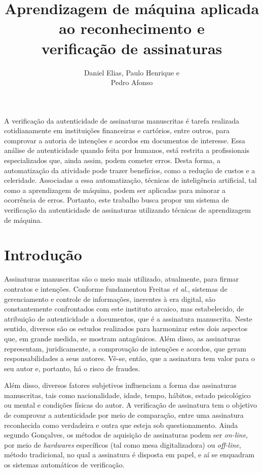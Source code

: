 \documentclass[12pt]{article}
\title{Aprendizagem de máquina aplicada ao reconhecimento e \\verificação de assinaturas}
\author{Daniel Elias\inst{1}, Paulo Henrique\inst{1} e \\Pedro Afonso\inst{1}}
\begin{document}
 
	
	\maketitle
	
	\begin{resumo} 
		A verificação da autenticidade de assinaturas manuscritas é tarefa realizada cotidianamente em instituições financeiras e cartórios, entre outros, para comprovar a autoria de intenções e acordos em documentos de interesse. Essa análise de autenticidade quando feita por humanos, está restrita a profissionais especializados que, ainda assim, podem cometer erros. Desta forma, a automatização da atividade pode trazer benefícios, como a redução de custos e a celeridade. Associadas a essa automatização, técnicas de inteligência artificial, tal como a aprendizagem de máquina, podem ser aplicadas para minorar a ocorrência de erros. Portanto, este trabalho busca propor um sistema de verificação da autenticidade de assinaturas utilizando técnicas de aprendizagem de máquina.
	\end{resumo}
	
	\section{Introdução}	
		Assinaturas manuscritas são o meio mais utilizado, atualmente, para firmar contratos e intenções. Conforme fundamentou Freitas \textit{et al}.\cite{freitas2003}, sistemas de gerenciamento e controle de informações, inerentes à era digital, são constantemente confrontados com este instituto arcaico, mas estabelecido, de atribuição de autenticidade a documentos, que é a assinatura manuscrita. Neste sentido, diversos são os estudos realizados para harmonizar estes dois aspectos que, em grande medida, se mostram antagônicos. Além disso, as assinaturas representam, juridicamente, a comprovação de intenções e acordos, que geram responsabilidades a seus autores. Vê-se, então, que a assinatura tem valor para o seu autor e, portanto, há o risco de fraudes.
		
		Além disso, diversos fatores subjetivos influenciam a forma das assinaturas manuscritas, tais como nacionalidade, idade, tempo, hábitos, estado psicológico ou mental e condições físicas do autor. A verificação de assinatura tem o objetivo de comprovar a autenticidade por meio de comparação, entre uma assinatura reconhecida como verdadeira e outra que esteja sob questionamento\cite{goncalves2008}. Ainda segundo Gonçalves\cite{goncalves2008}, os métodos de aquisição de assinaturas podem ser \textit{on-line}, por meio de \textit{hardwares} específicos (tal como mesa digitalizadora) ou \textit{off-line}, método tradicional, no qual a assinatura é disposta em papel, e aí se enquadram os sistemas automáticos de verificação.	
		
\end{document}
